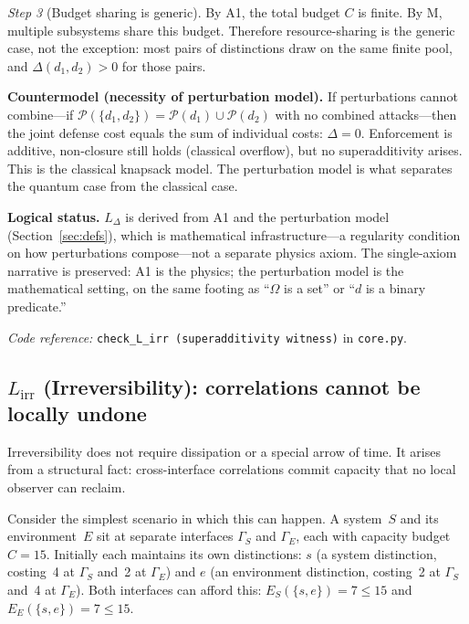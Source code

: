 \documentclass[11pt]{article}
\newcommand{\coderef}[2]{\smallskip\noindent\textit{Code reference:} \texttt{#1} in \texttt{#2}.}
\begin{document}
\begin{tcolorbox}[apfbox, title={$L_{\Delta}$ (Competition): Superadditivity from Shared Budgets}]
\textit{Step 3} (Budget sharing is generic).  By A1, the total budget $C$ is finite.  By M, multiple subsystems share this budget.  Therefore resource-sharing is the generic case, not the exception: most pairs of distinctions draw on the same finite pool, and $\Delta(d_1, d_2) > 0$ for those pairs.

\smallskip\noindent\textbf{Countermodel (necessity of perturbation model).}  If perturbations cannot combine---if $\mathcal{P}(\{d_1, d_2\}) = \mathcal{P}(d_1) \cup \mathcal{P}(d_2)$ with no combined attacks---then the joint defense cost equals the sum of individual costs: $\Delta = 0$.  Enforcement is additive, non-closure still holds (classical overflow), but no superadditivity arises.  This is the classical knapsack model.  The perturbation model is what separates the quantum case from the classical case.

\smallskip\noindent\textbf{Logical status.}  $L_\Delta$ is derived from A1 and the perturbation model (Section~\ref{sec:defs}), which is mathematical infrastructure---a regularity condition on how perturbations compose---not a separate physics axiom.  The single-axiom narrative is preserved: A1 is the physics; the perturbation model is the mathematical setting, on the same footing as ``$\Omega$ is a set'' or ``$d$ is a binary predicate.''

\coderef{check\_L\_irr (superadditivity witness)}{core.py}
\end{tcolorbox}


\subsection{\texorpdfstring{$L_{\mathrm{irr}}$}{L irr} (Irreversibility): correlations cannot be locally undone}

Irreversibility does not require dissipation or a special arrow of time.  It arises from a structural fact: cross-interface correlations commit capacity that no local observer can reclaim.

Consider the simplest scenario in which this can happen.  A system~$S$ and its environment~$E$ sit at separate interfaces $\Gamma_S$ and $\Gamma_E$, each with capacity budget $C = 15$.  Initially each maintains its own distinctions: $s$ (a system distinction, costing~4 at $\Gamma_S$ and~2 at $\Gamma_E$) and $e$ (an environment distinction, costing~2 at $\Gamma_S$ and~4 at $\Gamma_E$).  Both interfaces can afford this: $E_S(\{s,e\}) = 7 \le 15$ and $E_E(\{s,e\}) = 7 \le 15$.
\end{document}
